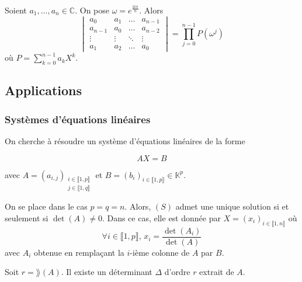 	\begin{example}
		Soient $a_1, \dots, a_n \in \mathbb{C}$. On pose $\omega = e^{\frac{2i\pi}{n}}$. Alors
		\[ \begin{vmatrix} a_0 & a_1 & \dots & a_{n-1} \\ a_{n-1} & a_0 & \dots & a_{n-2}\\ \vdots & \vdots & \ddots & \vdots \\ a_1 & a_2 & \dots & a_0 \end{vmatrix} = \prod_{j=0}^{n-1} P(\omega^j) \]
		où $P = \sum_{k=0}^{n-1} a_k X^k$.
	\end{example}
	
	\subsection{Applications}
	
	\subsubsection{Systèmes d'équations linéaires}
	
	
	On cherche à résoudre un système d'équations linéaires de la forme
	
	\[ AX = B \tag{S} \]
	
	avec $A = (a_{i,j})_{\substack{i \in \llbracket 1, p \rrbracket \\ j \in \llbracket 1, q \rrbracket}}$ et $B = (b_i)_{i \in \llbracket 1, p \rrbracket} \in \mathbb{K}^p$.
	
	\begin{theorem}
		On se place dans le cas $p = q = n$. Alors, $(S)$ admet une unique solution si et seulement si $\det(A) \neq 0$. Dans ce cas, elle est donnée par $X = (x_i)_{i \in \llbracket 1, n \rrbracket}$ où
		\[ \forall i \in \llbracket 1, p \rrbracket, \, x_i = \frac{\det(A_i)}{\det(A)} \]
		avec $A_i$ obtenue en remplaçant la $i$-ième colonne de $A$ par $B$.
	\end{theorem}
	
	\begin{lemma}
		Soit $r = \rang(A)$. Il existe un déterminant $\Delta$ d'ordre $r$ extrait de $A$.
	\end{lemma}
	
